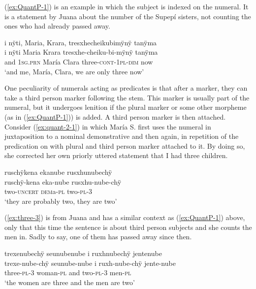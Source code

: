 (\ref{ex:QuantP-1}) is an example in which the subject is indexed on the numeral. It is a statement by Juana about the number of the Supepí sisters, not counting the ones who had already passed away.

\ea\label{ex:QuantP-1}
\begingl
\glpreamble i nÿti, Maria, Krara, tresxhecheikubimÿnÿ tanÿma\\
\gla i nÿti Maria Krara tresxhe-cheiku-bi-mÿnÿ tanÿma\\
\glb and 1\textsc{sg.prn} María Clara three-\textsc{cont}-1\textsc{pl}-\textsc{dim} now\\
\glft ‘and me, María, Clara, we are only three now’
\endgl
\trailingcitation{[jxx-p120430l-2.352-353]}
\xe

One peculiarity of numerals acting as predicates is that after a  marker, they can take a third person marker following the stem. This marker is usually part of the numeral, but it undergoes lenition if the plural marker or some other morpheme (as in (\ref{ex:QuantP-1})) is added. A third person marker is then attached. Consider (\ref{ex:quant-2-1}) in which María S. first uses the numeral in juxtaposition to a nominal demonstrative and then again, in repetition of the predication on with plural and third person marker attached to it. By doing so, she corrected her own priorly uttered statement that I had three children.

\ea\label{ex:quant-2-1}
\begingl
\glpreamble ruschÿkena ekanube rusxhunubechÿ\\
\gla ruschÿ-kena eka-nube rusxhu-nube-chÿ\\
\glb two-\textsc{uncert} \textsc{dem}a-\textsc{pl} two-\textsc{pl}-3\\
\glft ‘they are probably two, they are two’
\endgl
\trailingcitation{[rmx-e150922l.078]}
\xe

(\ref{ex:three-3}) is from Juana and has a similar context as (\ref{ex:QuantP-1}) above, only that this time the sentence is about third person subjects and she counts the men in. Sadly to say, one of them has passed away since then.

\ea\label{ex:three-3}
\begingl
\glpreamble trexenubechÿ seunubenube i ruxhnubechÿ jentenube\\
\gla trexe-nube-chÿ seunube-nube i ruxh-nube-chÿ jente-nube\\
\glb three-\textsc{pl}-3 woman-\textsc{pl} and two-\textsc{pl}-3 men-\textsc{pl}\\
\glft ‘the women are three and the men are two’
\endgl
\trailingcitation{[jxx-p120515l-2.239]}
\xe

